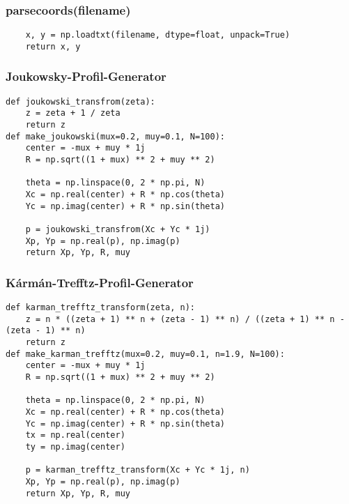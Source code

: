 \subsubsection{parsecoords(filename)}
\begin{lstlisting}
    x, y = np.loadtxt(filename, dtype=float, unpack=True)
    return x, y
\end{lstlisting}

\subsubsection{Joukowsky-Profil-Generator}

\begin{lstlisting}
def joukowski_transfrom(zeta):
    z = zeta + 1 / zeta
    return z
def make_joukowski(mux=0.2, muy=0.1, N=100):
    center = -mux + muy * 1j 
    R = np.sqrt((1 + mux) ** 2 + muy ** 2)

    theta = np.linspace(0, 2 * np.pi, N)
    Xc = np.real(center) + R * np.cos(theta)
    Yc = np.imag(center) + R * np.sin(theta)

    p = joukowski_transfrom(Xc + Yc * 1j)
    Xp, Yp = np.real(p), np.imag(p)
    return Xp, Yp, R, muy
\end{lstlisting}

\subsubsection{Kármán-Trefftz-Profil-Generator}

\begin{lstlisting}
def karman_trefftz_transform(zeta, n):
    z = n * ((zeta + 1) ** n + (zeta - 1) ** n) / ((zeta + 1) ** n - (zeta - 1) ** n)
    return z
def make_karman_trefftz(mux=0.2, muy=0.1, n=1.9, N=100):
    center = -mux + muy * 1j
    R = np.sqrt((1 + mux) ** 2 + muy ** 2) 

    theta = np.linspace(0, 2 * np.pi, N)
    Xc = np.real(center) + R * np.cos(theta)
    Yc = np.imag(center) + R * np.sin(theta)
    tx = np.real(center)
    ty = np.imag(center)

    p = karman_trefftz_transform(Xc + Yc * 1j, n)
    Xp, Yp = np.real(p), np.imag(p)
    return Xp, Yp, R, muy
\end{lstlisting}


